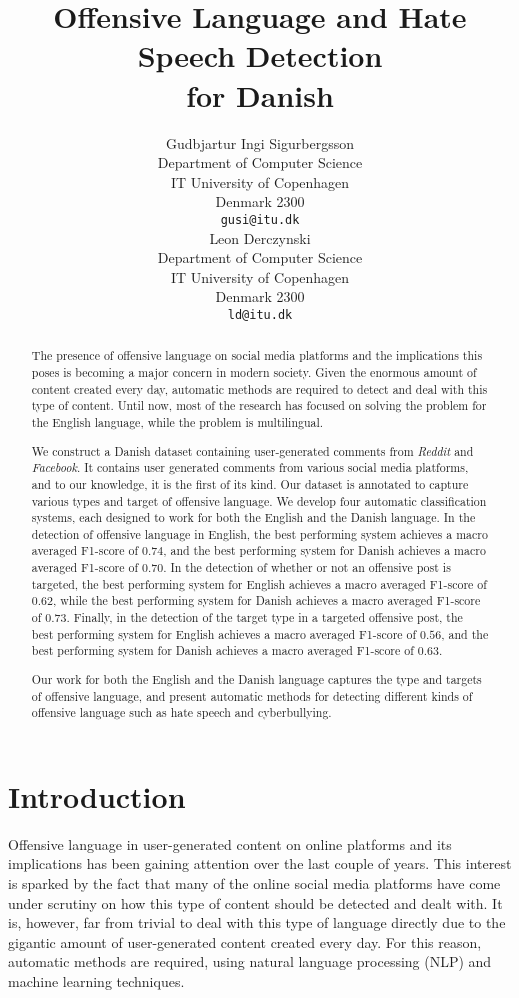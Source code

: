 \documentclass{article}
\title{Offensive Language and Hate Speech Detection \\ for Danish}
\author{
  Gudbjartur Ingi Sigurbergsson\\
  Department of Computer Science\\
  IT University of Copenhagen\\
  Denmark 2300 \\
  \texttt{gusi@itu.dk} \\
\And
  Leon Derczynski\\
  Department of Computer Science\\
  IT University of Copenhagen\\
  Denmark 2300 \\
  \texttt{ld@itu.dk} \\
}
\begin{document}
\maketitle

\begin{abstract}
The presence of offensive language on social media platforms and the implications this poses is becoming a major concern in modern society. Given the enormous amount of content created every day, automatic methods are required to detect and deal with this type of content. Until now, most of the research has focused on solving the problem for the English language, while the problem is multilingual. 



We construct a Danish dataset containing user-generated comments from \textit{Reddit} and \textit{Facebook}.
It contains user generated comments from various social media platforms, and to our knowledge, it is the first of its kind.
Our dataset is annotated to capture various types and target of offensive language.
We develop four automatic classification systems, each designed to work for both the English and the Danish language. In the detection of offensive language in English, the best performing system achieves a macro averaged F1-score of $0.74$, and the best performing system for Danish achieves a macro averaged F1-score of $0.70$. In the detection of whether or not an offensive post is targeted, the best performing system for English achieves a macro averaged F1-score of $0.62$, while the best performing system for Danish achieves a macro averaged F1-score of $0.73$. Finally, in the detection of the target type in a targeted offensive post, the best performing system for English achieves a macro averaged F1-score of $0.56$, and the best performing system for Danish achieves a macro averaged F1-score of $0.63$.

Our work for both the English and the Danish language captures the type and targets of offensive language, and present automatic methods for detecting different kinds of offensive language such as hate speech and cyberbullying. 

\end{abstract}




\section{Introduction}
\label{ch:intro}
Offensive language in user-generated content on online platforms and its implications has been gaining attention over the last couple of years. This interest is sparked by the fact that many of the online social media platforms have come under scrutiny on how this type of content should be detected and dealt with. It is, however, far from trivial to deal with this type of language directly due to the gigantic amount of user-generated content created every day. For this reason, automatic methods are required, using natural language processing (NLP) and machine learning techniques.
\end{document}
